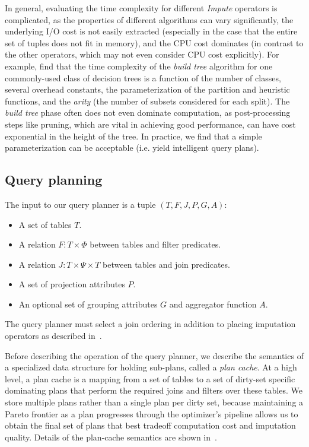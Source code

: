 In general, evaluating the time complexity for different \textit{Impute} operators is
complicated, as the properties of
different algorithms can vary significantly, the underlying I/O cost
is not easily extracted (especially in the case that the entire set of tuples does not
fit in memory), and the CPU cost dominates (in contrast to the other operators, which may
not even consider CPU cost explicitly). For example, \cite{martin1995time} find that the
time complexity of the \textit{build tree} algorithm for one commonly-used class of
decision trees is a function of the number of classes, several overhead constants, the
parameterization of the partition and heuristic functions, and the \textit{arity} (the
number of subsets considered for each split). The \textit{build tree} phase often
does not even dominate computation, as post-processing steps like pruning, which are vital
in achieving good performance, can have cost exponential in the height of the tree. In
practice, we find that a simple parameterization can be acceptable (i.e. yield intelligent query
plans).

\subsection{Query planning}
\label{sec:planning}
The input to our query planner is a tuple $(T, F, J, P, G, A)$:
\begin{itemize}
\item A set of tables $T$.
\item A relation $F: T \times \Phi$ between tables and filter predicates.
\item A relation $J : T \times \Psi \times T$ between tables and join predicates.
\item A set of projection attributes $P$.
\item An optional set of grouping attributes $G$ and aggregator function $A$.
\end{itemize}

The query planner must select a join ordering in addition to placing imputation operators as described in~.

Before describing the operation of the query planner, we describe the semantics of a specialized data structure for holding sub-plans, called a \emph{plan cache}.
At a high level, a plan cache is a mapping from a set of tables to a set of dirty-set specific dominating plans that perform the required joins and filters over these tables.
We store multiple plans rather than a single plan per dirty set, because maintaining a Pareto frontier as a plan progresses through the optimizer's pipeline
allows us to obtain the final set of plans that best tradeoff computation
cost and imputation quality. Details of the plan-cache semantics are shown in~.


